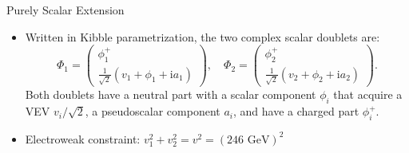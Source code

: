 \documentclass{../bredelebeamer}
\begin{document}
\begin{frame}{Purely Scalar Extension}
\begin{itemize}
          \vfill \pause
        \item Written in Kibble parametrization, the two complex scalar doublets are:
        \begin{equation*}
            \Phi_1=
            \begin{pmatrix}
                {{\phi_1^{+}}}\\
                {\frac{1}{\sqrt{2}}\left({v_1}+{\phi_1}+\mathrm{i} {a_1}\right)}
            \end{pmatrix}, 
            \quad \Phi_2=
            \begin{pmatrix}
                {\phi_2^{+}}\\
                {\frac{1}{\sqrt{2}}\left(v_2+\phi_2+\mathrm{i} a_2\right)}
            \end{pmatrix}.
        \end{equation*}
        Both doublets have a neutral part with a {scalar component $\phi_i$} that acquire a {VEV $v_i/\sqrt{2}$}, a {pseudoscalar component $a_i$},  and have a {charged part $\phi_i^+$}.
        \item Electroweak constraint: $v_1^2 + v_2^2 = v^2 = (246 \text{ GeV})^2$
    \end{itemize}
    
    
\end{frame}
\end{document}
